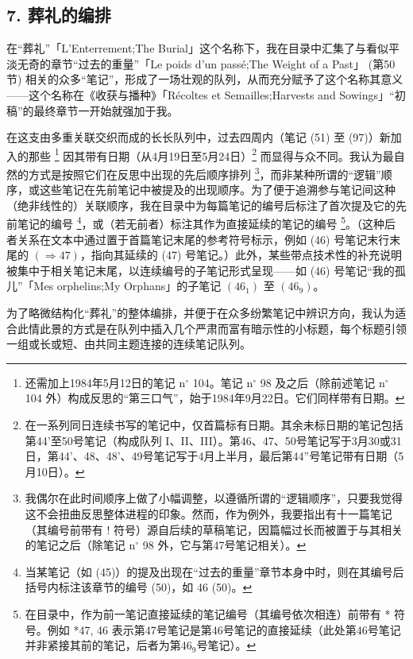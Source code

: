 \subsection*{7. 葬礼的编排}

在“葬礼”「L'Enterrement;The Burial」这个名称下，我在目录中汇集了与看似平淡无奇的章节“过去的重量”「Le poids d'un passé;The Weight of a Past」 (第50节) 相关的众多“笔记”，形成了一场壮观的队列，从而充分赋予了这个名称其意义——这个名称在《收获与播种》「Récoltes et Semailles;Harvests and Sowings」“初稿”的最终章节一开始就强加于我。

在这支由多重关联交织而成的长长队列中，过去四周内（笔记 (51) 至 (97)）新加入的那些 \footnote{还需加上1984年5月12日的笔记 $\mathrm{n}^{\circ}$ 104。笔记 $\mathrm{n}^{\circ}$ 98 及之后（除前述笔记 $\mathrm{n}^{\circ}$ 104 外）构成反思的“第三口气”，始于1984年9月22日。它们同样带有日期。} 因其带有日期（从4月19日至5月24日）\footnote{在一系列同日连续书写的笔记中，仅首篇标有日期。其余未标日期的笔记包括第44'至50号笔记（构成队列 I、II、III）。第46、47、50号笔记写于3月30或31日，第44'、48、48'、49号笔记写于4月上半月，最后第44''号笔记带有日期（5月10日）。} 而显得与众不同。我认为最自然的方式是按照它们在反思中出现的先后顺序排列 \footnote{我偶尔在此时间顺序上做了小幅调整，以遵循所谓的“逻辑顺序”，只要我觉得这不会扭曲反思整体进程的印象。然而，作为例外，我要指出有十一篇笔记（其编号前带有 ! 符号）源自后续的草稿笔记，因篇幅过长而被置于与其相关的笔记之后（除笔记 $\mathrm{n}^{\circ}$ 98 外，它与第47号笔记相关）。}，而非某种所谓的“逻辑”顺序，或这些笔记在先前笔记中被提及的出现顺序。为了便于追溯参与笔记间这种（绝非线性的）关联顺序，我在目录中为每篇笔记的编号后标注了首次提及它的先前笔记的编号 \footnote{当某笔记（如 (45)）的提及出现在“过去的重量”章节本身中时，则在其编号后括号内标注该章节的编号 (50)，如 46 (50)。}，或（若无前者）标注其作为直接延续的笔记的编号 \footnote{在目录中，作为前一笔记直接延续的笔记编号（其编号依次相连）前带有 * 符号。例如 *47, 46 表示第47号笔记是第46号笔记的直接延续（此处第46号笔记并非紧接其前的笔记，后者为第46$_9$号笔记）。}。（这种后者关系在文本中通过置于首篇笔记末尾的参考符号标示，例如 (46) 号笔记末行末尾的 $(\Rightarrow 47)$，指向其延续的 (47) 号笔记。）此外，某些带点技术性的补充说明被集中于相关笔记末尾，以连续编号的子笔记形式呈现——如 (46) 号笔记“我的孤儿”「Mes orphelins;My Orphans」的子笔记 $\left(46_{1}\right)$ 至 $\left(46_{9}\right)$。

为了略微结构化“葬礼”的整体编排，并便于在众多纷繁笔记中辨识方向，我认为适合此情此景的方式是在队列中插入几个严肃而富有暗示性的小标题，每个标题引领一组或长或短、由共同主题连接的连续笔记队列。

